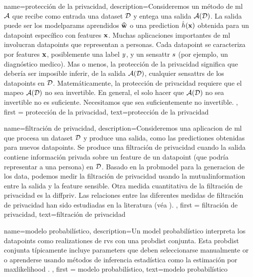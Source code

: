 {name=protección de la privacidad,
    description={Consideremos un método de \gls{ml}  $\mathcal{A}$ que recibe como entrada 
	 una \gls{dataset} $\mathcal{D}$ y entega una salida $\mathcal{A}(\mathcal{D})$. La salida 
	 puede ser los \gls{modelparams} aprendidos $\widehat{{\bf w}}$ o una \gls{prediction} 
	 $\hat{h}({\bf x})$ obtenida para un \gls{datapoint} específico con \gls{feature}s 
	 ${\bf x}$. Muchas aplicaciones importantes de \gls{ml} involucran \gls{datapoint}s 
		que representan a personas. Cada \gls{datapoint} se caracteriza por \gls{feature}s ${\bf x}$, 
		posiblemente una \gls{label} $y$, y un \gls{sensattr} $s$ (por ejemplo, un diagnóstico medico). 
		Mas o menos, la protección de la privacidad significa que debería ser imposible inferir, de la salida $\mathcal{A}(\mathcal{D})$, 
		cualquier \gls{sensattr}s de los \gls{datapoint}s en $\mathcal{D}$. Matemáticamente, la protección de privacidad requiere que  
		el mapeo $\mathcal{A}(\mathcal{D})$ no sea invertible. En general, el solo hacer que  $\mathcal{A}(\mathcal{D})$ no sea invertible 
		no es suficiente. Necesitamos que sea suficientemente no invertible. 
	}, 
	first = {protección de la privacidad}, text={protección de la privacidad} 
}

{
	name=filtración de privacidad,
	description={Consideremos una aplicacion de \gls{ml} que procesa un
	\gls{dataset} $\mathcal{D}$ y produce una salida, como las \gls{prediction}es 
	obtenidas para nuevos \gls{datapoint}s. Se produce una filtración de privacidad 
	cuando la salida contiene información privada sobre un \gls{feature} de un 
	\gls{datapoint} (que podría representar a una persona) en $\mathcal{D}$. Basado en la \gls{probmodel} 
	para la generacion de los \gls{data}, podemos medir la filtración de privacidad usando la \gls{mutualinformation} 
	entre la salida y la \gls{feature} sensible. Otra medida cuantitativa de la filtración de privacidad 
	es la \gls{diffpriv}. Las relaciones entre las diferentes medidas de filtración de privacidad han sido estudiadas en la literatura (véa \cite{InfThDiffPriv}). 
	}, 
	first = {filtración de privacidad}, text={filtración de privacidad} 
}



{
	name=modelo probabilístico,
	description={Un \gls{model} probabilístico interpreta los \gls{datapoint}s 
		como \gls{realization}es de \gls{rv}s con una \gls{probdist} conjunta. Esta \gls{probdist} conjunta típicamente 
		incluye \gls{parameters} que deben seleccionarse manualmente or o aprenderse usando métodos de inferencia estadística  
		como la estimación por \gls{maxlikelihood} \cite{LC}. }, 
	first = {modelo probabilístico}, text={modelo probabilístico} 
}



